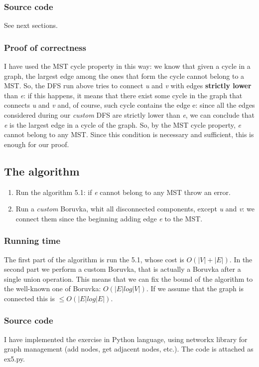 \documentclass[12pt]{article}
\begin{document}
\subsubsection{Source code}
See next sections.

\subsubsection{Proof of correctness}
I have used the MST cycle property in this way: we know that given a cycle in a graph, the largest edge among the ones that form the cycle cannot belong to a MST. So, the DFS run above tries to connect \textit{u} and \textit{v} with edges \textbf{strictly lower} than \textit{e}: if this happens, it means that there exist some cycle in the graph that connects \textit{u} and \textit{v} and, of course, such cycle contains the edge e: since all the edges considered during our \textit{custom} DFS are strictly lower than \textit{e}, we can conclude that \textit{e} is the largest edge in a cycle of the graph. So, by the MST cycle property, \textit{e} cannot belong to any MST. Since this condition is necessary and sufficient, this is enough for our proof.

\subsection{The algorithm}
\begin{enumerate}
	\item Run the algorithm 5.1: if \textit{e} cannot belong to any MST throw an error.
	\item Run a \textit{custom} Boruvka, whit all disconnected components, except \textit{u} and \textit{v}: we connect them since the beginning adding edge \textit{e} to the MST.
\end{enumerate}

\subsubsection{Running time}
The first part of the algorithm is run the 5.1, whose cost is $O(|V| + |E|)$. In the second part we perform a custom Boruvka, that is actually a Boruvka after a single union operation. This means that we can fix the bound of the algorithm to the well-known one of Boruvka: $O(|E| log|V|)$. If we assume that the graph is connected this is $\leq O(|E| log|E|)$.

\subsubsection{Source code}
I have implemented the exercise in Python language, using networkx library for graph management (add nodes, get adjacent nodes, etc.). The code is attached as ex5.py.
\end{document}
